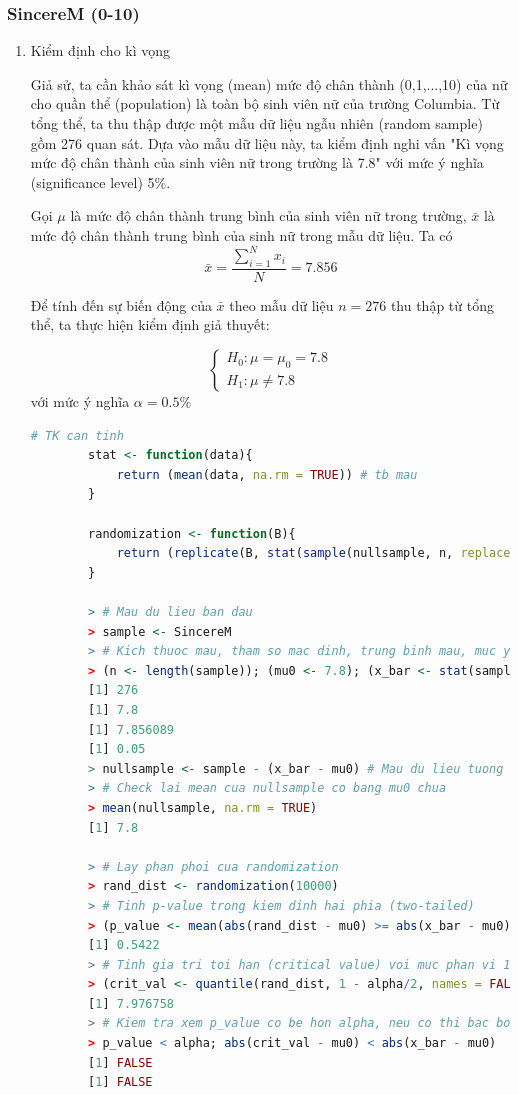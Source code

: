 \documentclass[a4paper,12pt]{article}
\begin{document}
	\subsubsection{SincereM (0-10)}
	\begin{enumerate}[label = \alph*)]
		\item Kiểm định cho kì vọng \label{3a}
		
		Giả sử, ta cần khảo sát kì vọng (mean) mức độ chân thành (0,1,...,10) của nữ cho quần thể (population) là toàn bộ sinh viên nữ của trường Columbia. Từ tổng thể, ta thu thập được một mẫu dữ liệu ngẫu nhiên (random sample) gồm 276 quan sát. Dựa vào mẫu dữ liệu này, ta kiểm định nghi vấn "Kì vọng mức độ chân thành của sinh viên nữ trong trường là 7.8" với mức ý nghĩa (significance level) 5\%.
		
		Gọi $\mu$ là mức độ chân thành trung bình của sinh viên nữ trong trường, $\bar{x}$ là mức độ chân thành trung bình của sinh nữ trong mẫu dữ liệu. Ta có
		$$\bar{x} = \frac{\sum_{i = 1}^{N}x_i}{N} =  7.856$$
		
		Để tính đến sự biến động của $\bar{x}$ theo mẫu dữ liệu $n = 276$ thu thập từ tổng thể, ta thực hiện kiểm định giả thuyết:
		
		\begin{equation*}
		\begin{cases}
		H_0: \mu = \mu_0 = 7.8\\
		H_1: \mu \neq 7.8
		\end{cases}
		\end{equation*}
		với mức ý nghĩa $\alpha = 0.5\%$
		
		\begin{lstlisting}[language=R]
		# TK can tinh
		stat <- function(data){
			return (mean(data, na.rm = TRUE)) # tb mau
		}
		
		randomization <- function(B){
			return (replicate(B, stat(sample(nullsample, n, replace = TRUE))))
		}
		
		> # Mau du lieu ban dau
		> sample <- SincereM
		> # Kich thuoc mau, tham so mac dinh, trung binh mau, muc y nghia
		> (n <- length(sample)); (mu0 <- 7.8); (x_bar <- stat(sample)); (alpha <- 0.05)
		[1] 276
		[1] 7.8
		[1] 7.856089
		[1] 0.05
		> nullsample <- sample - (x_bar - mu0) # Mau du lieu tuong ung voi H0
		> # Check lai mean cua nullsample co bang mu0 chua
		> mean(nullsample, na.rm = TRUE)
		[1] 7.8
		 
		> # Lay phan phoi cua randomization
		> rand_dist <- randomization(10000)
		> # Tinh p-value trong kiem dinh hai phia (two-tailed)
		> (p_value <- mean(abs(rand_dist - mu0) >= abs(x_bar - mu0)))
		[1] 0.5422
		> # Tinh gia tri toi han (critical value) voi muc phan vi 1-alpha/2
		> (crit_val <- quantile(rand_dist, 1 - alpha/2, names = FALSE))
		[1] 7.976758
		> # Kiem tra xem p_value co be hon alpha, neu co thi bac bo H0
		> p_value < alpha; abs(crit_val - mu0) < abs(x_bar - mu0)
		[1] FALSE
		[1] FALSE
		\end{lstlisting}
		

\end{enumerate}
\end{document}
